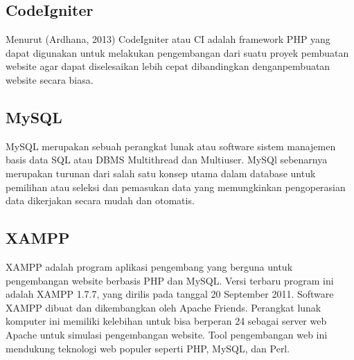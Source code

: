 \subsection{CodeIgniter}
Menurut (Ardhana, 2013) CodeIgniter atau CI adalah framework PHP yang dapat digunakan untuk melakukan pengembangan dari suatu proyek pembuatan website agar dapat diselesaikan lebih cepat dibandingkan denganpembuatan website secara biasa.

\subsection{MySQL}
MySQL merupakan sebuah perangkat lunak atau software sistem manajemen basis data SQL atau DBMS Multithread dan Multiuser. MySQl sebenarnya merupakan turunan dari salah satu konsep utama dalam database untuk pemilihan atau seleksi dan pemasukan data yang
memungkinkan pengoperasian data dikerjakan secara mudah dan otomatis.

\subsection{XAMPP}
XAMPP adalah program aplikasi pengembang yang berguna untuk pengembangan website berbasis PHP dan MySQL. Versi terbaru program ini adalah XAMPP 1.7.7, yang dirilis pada tanggal 20 September 2011. Software XAMPP dibuat dan dikembangkan oleh Apache Friends. Perangkat lunak komputer ini memiliki kelebihan untuk bisa berperan 24 sebagai server web Apache untuk simulasi pengembangan website. Tool pengembangan web ini mendukung teknologi web populer seperti PHP, MySQL, dan Perl.


